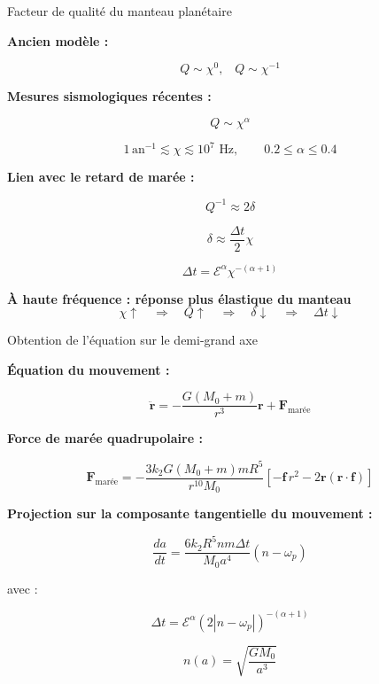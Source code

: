 \documentclass{beamer}
\begin{document}
	\begin{frame}{Facteur de qualité du manteau planétaire}
		
		\small
		
		\textbf{Ancien modèle :}
		
		\[Q \sim \chi^{0}, \,\,\,\,\, 
		Q \sim \chi^{-1}
		\]
		
		\vspace{0.18cm}
		
		\textbf{Mesures sismologiques récentes :}
		
		\[
		Q \sim \chi^\alpha
		\]
		
		\[
		1\,\text{an}^{-1} \lesssim \chi \lesssim 10^7 \text{ Hz},
		\qquad
		0.2 \leq \alpha \leq 0.4
		\]
		
		\vspace{0.18cm}
		
		\textbf{Lien avec le retard de marée :}
		
		\[
		Q^{-1}\approx 2\delta
		\]
		
		\[
		\delta \approx \frac{\Delta t}{2}\chi
		\]
		
		\[
		\Delta t
		=
		\mathcal{E}^{\alpha}
		\chi^{-(\alpha+1)}
		\]
		
		\vspace{0.13cm}
		\textbf{À haute fréquence : réponse plus élastique du manteau}
		\[
		\chi \uparrow
		\quad \Rightarrow \quad
		Q \uparrow
		\quad \Rightarrow \quad
		\delta \downarrow
		\quad \Rightarrow \quad
		\Delta t \downarrow
		\]
	\end{frame}
	
	\begin{frame}{Obtention de l’équation sur le demi-grand axe}
		
		\small
		
		\textbf{Équation du mouvement :}
		
		\[
		\ddot{\mathbf r}
		=
		-\frac{G(M_0+m)}{r^3}\mathbf r
		+
		\mathbf F_{\text{marée}}
		\]
		
		\vspace{0.15cm}
		
		\textbf{Force de marée quadrupolaire :}
		
		\[
		\mathbf F_{\text{marée}}
		=
		-\frac{3k_2G(M_0+m)mR^5}{r^{10}M_0}
		\left[
		-\mathbf f\,r^2
		-
		2\mathbf r(\mathbf r\cdot\mathbf f)
		\right]
		\]
		
		\vspace{0.15cm}
		
		\textbf{Projection sur la composante tangentielle du mouvement :}
		
		
		\[
		\frac{da}{dt}
		=
		\frac{6k_2R^5nm\Delta t}{M_0a^4}(n-\omega_p)
		\]
		
		avec :
		
		\[
		\Delta t
		=
		\mathcal{E}^{\alpha}
		\left(2|n-\omega_p|\right)^{-(\alpha+1)}
		\]
		
		\[
		n(a)=\sqrt{\frac{GM_0}{a^3}}
		\]
		
	\end{frame}
	
\end{document}
